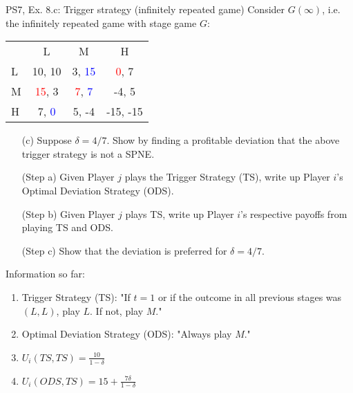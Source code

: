 \begin{frame}{PS7, Ex. 8.c: Trigger strategy (infinitely repeated game)}
    Consider $G(\infty)$, i.e. the infinitely repeated game with stage game $G$: \vspace{-6pt}
    \begin{table}
      \begin{tabular}{l|c|c|c|}
        \multicolumn{1}{c}{} & \multicolumn{1}{c}{L} & \multicolumn{1}{c}{M} & \multicolumn{1}{c}{H} \\\cline{2-4}
        L & 10, 10 & 3, \textcolor{blue}{15} & \textcolor{red}{0}, 7 \\\cline{2-4}
        M & \textcolor{red}{15}, 3 & \textcolor{red}{7}, \textcolor{blue}{7} & -4, 5 \\\cline{2-4}
        H & 7, \textcolor{blue}{0} & 5, -4 & -15, -15 \\\cline{2-4}
      \end{tabular}
    \end{table}
    \begin{itemize}
      \vspace{-4pt} \item[(c)] Suppose $\delta = 4/7$. Show by finding a profitable deviation that the above trigger strategy is not a SPNE. \vspace{-6pt}
    \end{itemize}
  \begin{multicols}{2}
    \begin{itemize}
      \item[(Step a)] Given Player $j$ plays the Trigger Strategy (TS), write up Player $i$'s Optimal Deviation Strategy (ODS).
      \item[(Step b)] Given Player $j$ plays TS, write up Player $i$'s respective payoffs from playing TS and ODS.
      \item[(Step c)] Show that the deviation is preferred for $\delta=4/7$.
    \end{itemize}
    \vfill\null\columnbreak
    Information so far:
    \begin{enumerate}
      \item Trigger Strategy (TS): "If $t=1$ or if the outcome in all previous stages was $(L,L)$, play $L$. If not, play $M$."
      \item Optimal Deviation Strategy (ODS): "Always play $M$."
      \item $U_i(TS,TS)=\frac{10}{1-\delta}$
      \item $U_i(ODS,TS)=15+\frac{7\delta}{1-\delta}$
    \end{enumerate}
    \vfill\null
  \end{multicols}
\end{frame}
